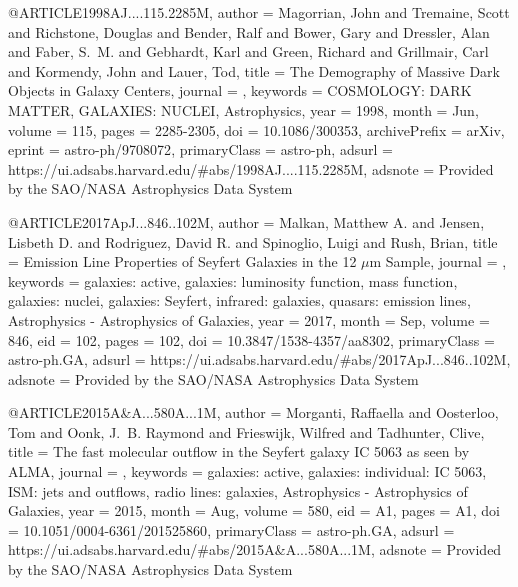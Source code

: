 \documentclass[longauth]{aa}
\begin{document}
{@ARTICLE{1998AJ....115.2285M,
       author = {{Magorrian}, John and {Tremaine}, Scott and {Richstone}, Douglas and {Bender}, Ralf and {Bower}, Gary and {Dressler}, Alan and {Faber}, S.~M. and {Gebhardt}, Karl and {Green}, Richard and {Grillmair}, Carl and {Kormendy}, John and {Lauer}, Tod},
        title = {The Demography of Massive Dark Objects in Galaxy Centers},
      journal = {\aj},
     keywords = {COSMOLOGY: DARK MATTER, GALAXIES: NUCLEI, Astrophysics},
         year = 1998,
        month = Jun,
       volume = {115},
        pages = {2285-2305},
          doi = {10.1086/300353},
archivePrefix = {arXiv},
       eprint = {astro-ph/9708072},
 primaryClass = {astro-ph},
       adsurl = {https://ui.adsabs.harvard.edu/#abs/1998AJ....115.2285M},
      adsnote = {Provided by the SAO/NASA Astrophysics Data System}
}

@ARTICLE{2017ApJ...846..102M,
       author = {{Malkan}, Matthew A. and {Jensen}, Lisbeth D. and {Rodriguez}, David R. and {Spinoglio}, Luigi and {Rush}, Brian},
       title = {Emission Line Properties of Seyfert Galaxies in the 12 {\ensuremath{\mu}}m Sample},
      journal = {\apj},
     keywords = {galaxies: active, galaxies: luminosity function, mass function, galaxies: nuclei, galaxies: Seyfert, infrared: galaxies, quasars: emission lines, Astrophysics - Astrophysics of Galaxies},
         year = 2017,
        month = Sep,
       volume = {846},
          eid = {102},
        pages = {102},
          doi = {10.3847/1538-4357/aa8302},
 primaryClass = {astro-ph.GA},
       adsurl = {https://ui.adsabs.harvard.edu/#abs/2017ApJ...846..102M},
      adsnote = {Provided by the SAO/NASA Astrophysics Data System}
}

@ARTICLE{2015A&A...580A...1M,
       author = {{Morganti}, Raffaella and {Oosterloo}, Tom and {Oonk}, J.~B. Raymond and {Frieswijk}, Wilfred and {Tadhunter}, Clive},
       title = {The fast molecular outflow in the Seyfert galaxy IC 5063 as seen by ALMA},
      journal = {\aap},
     keywords = {galaxies: active, galaxies: individual: IC 5063, ISM: jets and outflows, radio lines: galaxies, Astrophysics - Astrophysics of Galaxies},
         year = 2015,
        month = Aug,
       volume = {580},
          eid = {A1},
        pages = {A1},
          doi = {10.1051/0004-6361/201525860},
 primaryClass = {astro-ph.GA},
       adsurl = {https://ui.adsabs.harvard.edu/#abs/2015A&A...580A...1M},
      adsnote = {Provided by the SAO/NASA Astrophysics Data System}
}

}
\end{document}
